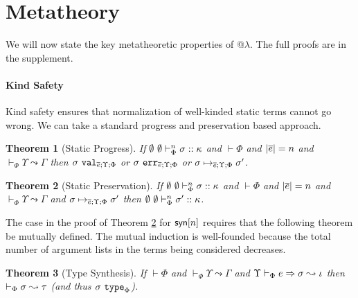 \documentclass[10pt,preprint]{sigplanconf}
\newtheorem{theorem}{Theorem}
\newtheorem{lemma}{Lemma}
\begin{document}


\section{Metatheory}\label{metatheory}
We will now state the key metatheoretic properties of @$\lambda$. The full proofs are in the supplement. 

\paragraph{Kind Safety} Kind safety ensures that normalization of well-kinded static terms cannot go wrong. We can take a standard progress and preservation based approach. 
\begin{theorem}[Static Progress]\label{thm:static-progress}
If $\emptyset~\emptyset \vdash_{\Phi}^{n} \sigma :: \kappa$ and $\vdash \Phi$ and $|\overline{e}|=n$ and $\vdash_\Phi \Upsilon \leadsto \Gamma$ then $\sigma~\mathtt{val}_{\overline{e}; \Upsilon; \Phi}$ or $\sigma~\mathtt{err}_{\overline{e}; \Upsilon; \Phi}$ or $\sigma \mapsto_{\overline{e}; \Upsilon; \Phi} \sigma'$.
\end{theorem}

\begin{theorem}[Static Preservation]\label{thm:static-preservation}
If $\emptyset~\emptyset \vdash_{\Phi}^{n} \sigma :: \kappa$ and $\vdash \Phi$ and $|\overline{e}|=n$ and $\vdash_\Phi \Upsilon \leadsto \Gamma$ and $\sigma \mapsto_{\overline{e}; \Upsilon; \Phi} \sigma'$ then $\emptyset~\emptyset \vdash_{\Phi}^{n} \sigma' :: \kappa$.
\end{theorem}
The case in the proof of Theorem \ref{thm:static-preservation} for ${\sf syn}[n]$ requires that the following theorem be mutually defined. The mutual induction is well-founded because the total number of argument lists in the terms being considered decreases.
\begin{theorem}[Type Synthesis]
If $\vdash \Phi$ and $\vdash_\Phi \Upsilon \leadsto \Gamma$ and $\Upsilon \vdash_{\Phi} e \Rightarrow \sigma \leadsto \iota$ then $\vdash_\Phi \sigma \leadsto \tau$ (and thus $\sigma~\texttt{type}_{\Phi}$). 
\end{theorem}
\end{document}
